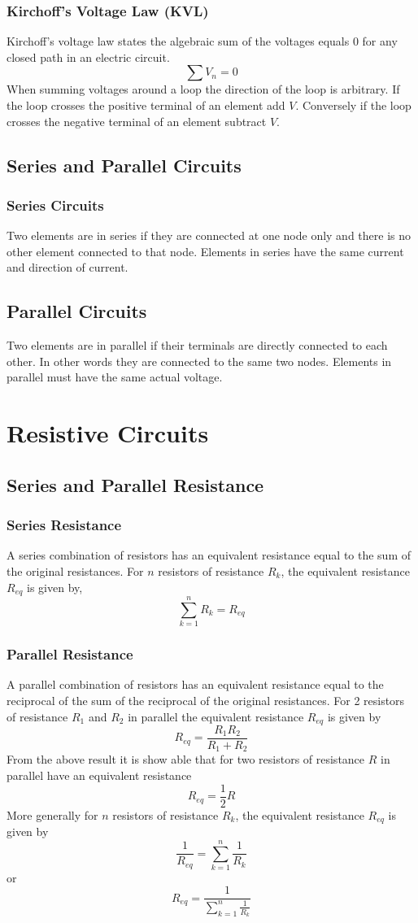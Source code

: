 \documentclass[14pt]{article}
\begin{document}
    \subsubsection{Kirchoff's Voltage Law (KVL)}
    Kirchoff's voltage law states the algebraic sum of the voltages
    equals 0 for any closed path in an electric circuit.
    $$\sum V_n=0$$ When summing voltages around a loop the direction of
    the loop is arbitrary. If the loop crosses the positive terminal of
    an element add $V$. Conversely if the loop crosses the negative
    terminal of an element subtract $V$.
    \subsection{Series and Parallel Circuits}
    \subsubsection{Series Circuits}
    Two elements are in series if they are connected at one node only
    and there is no other element connected to that node. Elements in
    series have the same current and direction of current.
    \subsection{Parallel Circuits}
    Two elements are in parallel if their terminals are directly
    connected to each other. In other words they are connected to the
    same two nodes. Elements in parallel must have the same actual
    voltage.
    \section{Resistive Circuits}
    \subsection{Series and Parallel Resistance}
    \subsubsection{Series Resistance}
    A series combination of resistors has an equivalent resistance equal
    to the sum of the original resistances. For $n$ resistors of
    resistance $R_k$, the equivalent resistance $R_{eq}$ is given by,
    $$\sum\limits_{k=1}^nR_k=R_{eq}$$
    \subsubsection{Parallel Resistance}
    A parallel combination of resistors has an equivalent resistance
    equal to the reciprocal of the sum of the reciprocal of the original
    resistances. For 2 resistors of resistance $R_1$ and $R_2$ in
    parallel the equivalent resistance $R_{eq}$ is given by
    $$R_{eq}=\frac{R_1R_2}{R_1+R_2}$$ From the above result it is show
    able that for two resistors of resistance $R$ in parallel have an
    equivalent resistance 
    $$R_{eq}=\frac{1}{2}R$$ More generally for $n$ resistors of
    resistance $R_k$, the equivalent resistance $R_{eq}$ is given by
    $$\frac{1}{R_{eq}}=\sum\limits_{k=1}^n\frac{1}{R_k}$$ or
    $$R_{eq}=\frac{1}{\sum\limits_{k=1}^n\frac{1}{R_k}}$$
\end{document}
